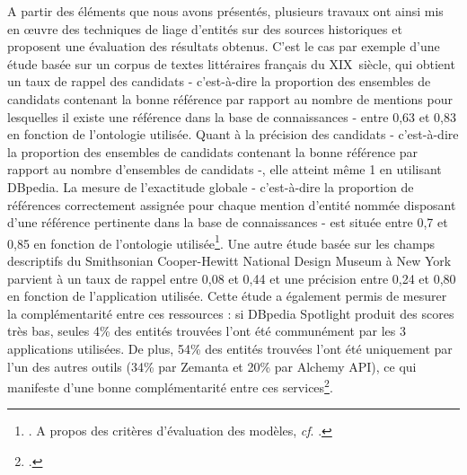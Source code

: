 \documentclass[a4paper,12pt,twoside]{book}
\begin{document}
	A partir des éléments que nous avons présentés, plusieurs travaux ont ainsi mis en œuvre des techniques de liage d'entités sur des sources historiques et proposent une évaluation des résultats obtenus. C'est le cas par exemple d'une étude basée sur un corpus de textes littéraires français du XIX\ieme\ siècle, qui obtient un taux de rappel des candidats - c'est-à-dire la proportion des ensembles de candidats contenant la bonne référence par rapport au nombre de mentions pour lesquelles il existe une référence dans la base de connaissances - entre 0,63 et 0,83 en fonction de l'ontologie utilisée. Quant à la précision des candidats - c'est-à-dire la proportion des ensembles de candidats contenant la bonne référence par rapport au nombre d'ensembles de candidats -, elle atteint même 1 en utilisant DBpedia. La mesure de l'exactitude globale - c'est-à-dire la proportion de références correctement assignée pour chaque mention d'entité nommée disposant d'une référence pertinente dans la base de connaissances - est située entre 0,7 et 0,85 en fonction de l'ontologie utilisée\footnote{\cite{soudani_adaptation_2018}. A propos des critères d'évaluation des modèles, \textit{cf}. \cite{abadie_evaluation_2017}.}. Une autre étude basée sur les champs descriptifs du Smithsonian Cooper-Hewitt National Design Museum à New York parvient à un taux de rappel entre 0,08 et 0,44 et une précision entre 0,24 et 0,80 en fonction de l'application utilisée. Cette étude a également permis de mesurer la complémentarité entre ces ressources : si DBpedia Spotlight produit des scores très bas, seules 4\% des entités trouvées l'ont été communément par les 3 applications utilisées. De plus, 54\% des entités trouvées l'ont été uniquement par l'un des autres outils (34\% par Zemanta et 20\% par Alchemy API), ce qui manifeste d'une bonne complémentarité entre ces services\footcite{van_hooland_exploring_2015}.
	
\end{document}
